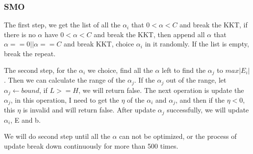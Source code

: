 \documentclass[conference,compsoc]{IEEEtran}
\begin{document}
		\subsubsection{SMO}\cite{platt199912}
			The first step, we get the list of all the $\alpha_i$ that $0<\alpha<C$ and break the KKT, 
			if there is no $\alpha$ have $0<\alpha<C$ and break the KKT, 
			then append all $\alpha$ that $\alpha==0||\alpha==C$ and break KKT, 
			choice $\alpha_i$ in it randomly. 
			If the list is empty, break the repeat.

			The second step, for the $\alpha_i$ we choice, find all the $\alpha$ left to find the $\alpha_j$ to $max|E_i|$.
			Then we can calculate the range of the $\alpha_j$. If the $\alpha_j$ out of the range, let $\alpha_j \gets bound$, if $L>=H$, we will return false.
			The next operation is update the $\alpha_j$, in this operation, I need to get the $\eta$ of the $\alpha_i$ and $\alpha_j$, and then if the $\eta<0$, this $\eta$ is invalid and will return false.
			After update $\alpha_j$ successfully, we will update $\alpha_i$, E and b.

			We will do second step until all the $\alpha$ can not be optimized, or the process of update break down continuously for more than 500 times.
			
\end{document}
